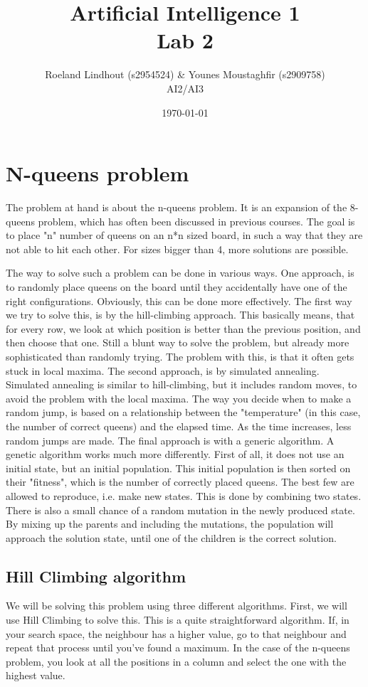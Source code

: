 \documentclass{article}
\title{Artificial Intelligence 1 \\ Lab 2}%
\author{Roeland Lindhout (s2954524) \& Younes Moustaghfir (s2909758) \\ AI2/AI3} %
\date{\today}%
\begin{document}
	
	\maketitle
	
	\section*{N-queens problem}
	
	The problem at hand is about the n-queens problem. It is an expansion of the 8-queens problem, which has often been discussed in previous courses. The goal is to place "n" number of queens on an n*n sized board, in such a way that they are not able to hit each other. For sizes bigger than 4, more solutions are possible.
	
	The way to solve such a problem can be done in various ways. One approach, is to randomly place queens on the board until they accidentally have one of the right configurations. Obviously, this can be done more effectively. The first way we try to solve this, is by the hill-climbing approach. This basically means, that for every row, we look at which position is better than the previous position, and then choose that one. Still a blunt way to solve the problem, but already more sophisticated than randomly trying. The problem with this, is that it often gets stuck in local maxima. The second approach, is by simulated annealing. Simulated annealing is similar to hill-climbing, but it includes random moves, to avoid the problem with the local maxima. The way you decide when to make a random jump, is based on a relationship between the "temperature" (in this case, the number of correct queens) and the elapsed time. As the time increases, less random jumps are made. The final approach is with a generic algorithm. A genetic algorithm works much more differently. First of all, it does not use an initial state, but an initial population. This initial population is then sorted on their "fitness", which is the number of correctly placed queens. The best few are allowed to reproduce, i.e. make new states. This is done by combining two states. There is also a small chance of a random mutation in the newly produced state. By mixing up the parents and including the mutations, the population will approach the solution state, until one of the children is the correct solution.
		
	\subsection{Hill Climbing algorithm}
	We will be solving this problem using three different algorithms. First, we will use Hill Climbing to solve this. This is a quite straightforward algorithm. If, in your search space, the neighbour has a higher value, go to that neighbour and repeat that process until you've found a maximum. In the case of the n-queens problem, you look at all the positions in a column and select the one with the highest value.
	
\end{document}

